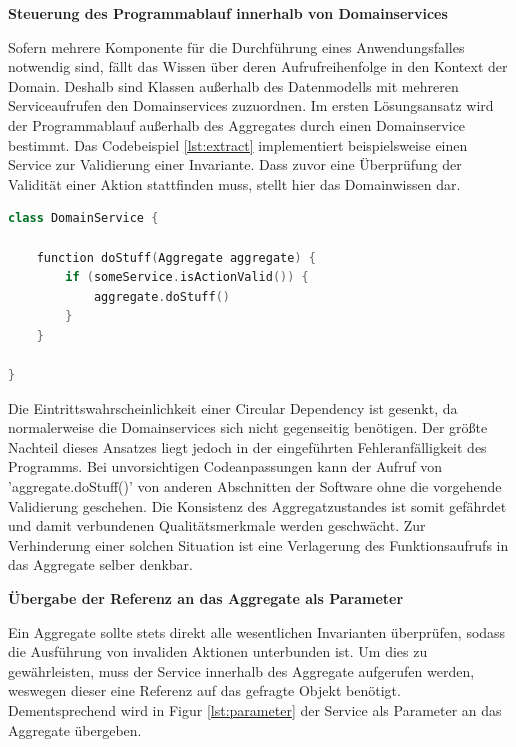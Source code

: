 \textbf{Steuerung des Programmablauf innerhalb von Domainservices}

Sofern mehrere Komponente für die Durchführung eines Anwendungsfalles notwendig sind, fällt das Wissen über deren Aufrufreihenfolge in den Kontext der Domain. Deshalb sind Klassen außerhalb des Datenmodells mit mehreren Serviceaufrufen den Domainservices zuzuordnen. Im ersten Lösungsansatz wird der Programmablauf außerhalb des Aggregates durch einen Domainservice bestimmt. Das Codebeispiel \ref{lst:extract} implementiert beispielsweise einen Service zur Validierung einer Invariante. Dass zuvor eine Überprüfung der Validität einer Aktion stattfinden muss, stellt hier das Domainwissen dar. 

\begin{minipage}{\linewidth} %
	\begin{lstlisting}[caption={Bestimmung des Steuerflusses durch einen Domainservice}, label={lst:extract}, language=Kotlin]
class DomainService {
	
	function doStuff(Aggregate aggregate) {
		if (someService.isActionValid()) {     
			aggregate.doStuff()
		}
	}

}
	\end{lstlisting}
\end{minipage}

Die Eintrittswahrscheinlichkeit einer Circular Dependency ist gesenkt, da normalerweise die Domainservices sich nicht gegenseitig benötigen. Der größte Nachteil dieses Ansatzes liegt jedoch in der eingeführten Fehleranfälligkeit des Programms. Bei unvorsichtigen Codeanpassungen kann der Aufruf von 'aggregate.doStuff()' von anderen Abschnitten der Software ohne die vorgehende Validierung geschehen. Die Konsistenz des Aggregatzustandes ist somit gefährdet und damit verbundenen Qualitätsmerkmale werden geschwächt. Zur Verhinderung einer solchen Situation ist eine Verlagerung des Funktionsaufrufs in das Aggregate selber denkbar.


\textbf{Übergabe der Referenz an das Aggregate als Parameter}

Ein Aggregate sollte stets direkt alle wesentlichen Invarianten überprüfen, sodass die Ausführung von invaliden Aktionen unterbunden ist. Um dies zu gewährleisten, muss der Service innerhalb des Aggregate aufgerufen werden, weswegen dieser eine Referenz auf das gefragte Objekt benötigt. Dementsprechend wird in Figur \ref{lst:parameter} der Service als Parameter an das Aggregate übergeben.


